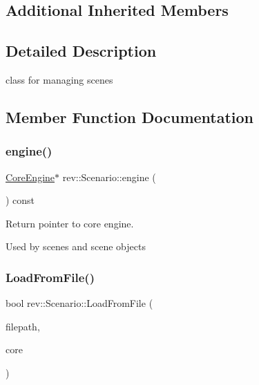 \subsection*{Additional Inherited Members}


\subsection{Detailed Description}
class for managing scenes 

\subsection{Member Function Documentation}
\mbox{\label{classrev_1_1_scenario_a5a8f8fe6743bdad9002ee3cd1c45005f}} 
\subsubsection{\texorpdfstring{engine()}{engine()}}
{\footnotesize\ttfamily \mbox{\hyperlink{classrev_1_1_core_engine}{Core\+Engine}}$\ast$ rev\+::\+Scenario\+::engine (\begin{DoxyParamCaption}{ }\end{DoxyParamCaption}) const\hspace{0.3cm}{\ttfamily [inline]}}



Return pointer to core engine. 

Used by scenes and scene objects \mbox{\label{classrev_1_1_scenario_ac313e7e73ffbd6a1e3d6fd98c2f191eb}} 
\subsubsection{\texorpdfstring{LoadFromFile()}{LoadFromFile()}}
{\footnotesize\ttfamily bool rev\+::\+Scenario\+::\+Load\+From\+File (\begin{DoxyParamCaption}\item[{const \mbox{\hyperlink{classrev_1_1_g_string}{G\+String}} \&}]{filepath,  }\item[{\mbox{\hyperlink{classrev_1_1_core_engine}{Core\+Engine}} $\ast$}]{core }\end{DoxyParamCaption})\hspace{0.3cm}{\ttfamily [static]}}



